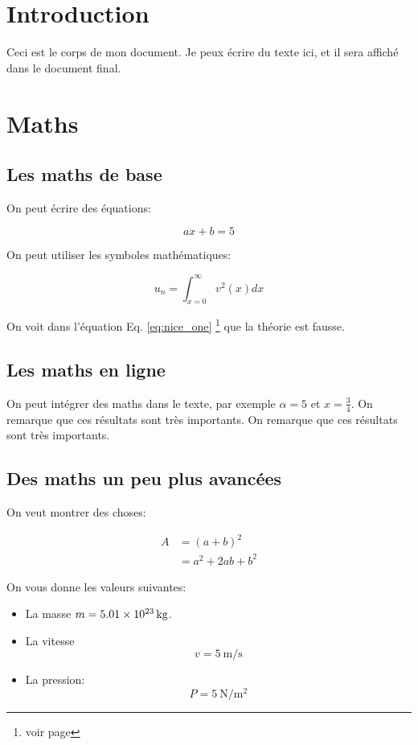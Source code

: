 \section{Introduction}

Ceci est le corps de mon document.
Je peux écrire du texte ici, et il sera affiché dans le document final.

\blindtext[1]



\section{Maths}

\subsection{Les maths de base}

On peut écrire des équations:
\blindtext

$$
    a x + b = 5
$$

\noindent On peut utiliser les symboles mathématiques:

\begin{equation}
    u_n = \int_{x=0}^\infty v^2(x) dx
    \label{eq:nice_one}
\end{equation}

On voit dans l'équation Eq. \ref{eq:nice_one} \footnote{voir page \pageref{eq:nice_one}} que la théorie est fausse.

\subsection{Les maths en ligne}

On peut intégrer des maths dans le texte, par exemple $\alpha = 5$ et $x = \frac{3}{4}$.
On remarque que ces résultats sont très importants.
On remarque que ces résultats sont très importants.

\subsection{Des maths un peu plus avancées}

On veut montrer des choses:

\begin{align}
    A & = \left( a + b\right)^2 \nonumber \\
      & = a^2 + 2 ab + b^2
\end{align}

On vous donne les valeurs suivantes:
\begin{itemize}
    \item La masse $m = \qty{5.01d23}{\kilo\gram}$.
    \item La vitesse
          $$
              v = \qty[per-mode=fraction]{5}{\meter\per\second}$$
    \item La pression:
          $$
              P = \qty{5}{\newton\per\meter\squared}
          $$
\end{itemize}

